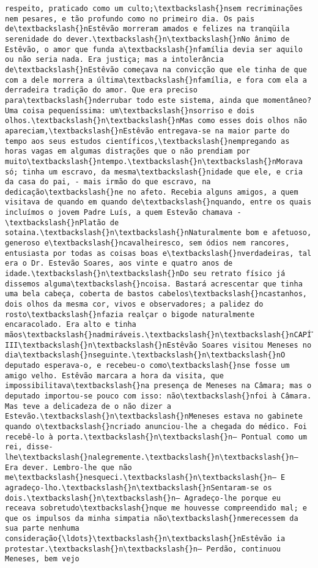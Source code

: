 \documentclass[11pt]{article}
\begin{document}
\begin{Verbatim}[commandchars=\\\{\}]
respeito, praticado como um culto;\textbackslash{}nsem recriminações nem pesares, e tão profundo como no primeiro dia. Os pais de\textbackslash{}nEstêvão morreram amados e felizes na tranqüila serenidade do dever.\textbackslash{}n\textbackslash{}nNo ânimo de Estêvão, o amor que funda a\textbackslash{}nfamília devia ser aquilo ou não seria nada. Era justiça; mas a intolerância de\textbackslash{}nEstêvão começava na convicção que ele tinha de que com a dele morrera a última\textbackslash{}nfamília, e fora com ela a derradeira tradição do amor. Que era preciso para\textbackslash{}nderrubar todo este sistema, ainda que momentâneo? Uma coisa pequeníssima: um\textbackslash{}nsorriso e dois olhos.\textbackslash{}n\textbackslash{}nMas como esses dois olhos não apareciam,\textbackslash{}nEstêvão entregava-se na maior parte do tempo aos seus estudos científicos,\textbackslash{}nempregando as horas vagas em algumas distrações que o não prendiam por muito\textbackslash{}ntempo.\textbackslash{}n\textbackslash{}nMorava só; tinha um escravo, da mesma\textbackslash{}nidade que ele, e cria da casa do pai, - mais irmão do que escravo, na dedicação\textbackslash{}ne no afeto. Recebia alguns amigos, a quem visitava de quando em quando de\textbackslash{}nquando, entre os quais incluímos o jovem Padre Luís, a quem Estevão chamava -\textbackslash{}nPlatão de sotaina.\textbackslash{}n\textbackslash{}nNaturalmente bom e afetuoso, generoso e\textbackslash{}ncavalheiresco, sem ódios nem rancores, entusiasta por todas as coisas boas e\textbackslash{}nverdadeiras, tal era o Dr. Estevão Soares, aos vinte e quatro anos de idade.\textbackslash{}n\textbackslash{}nDo seu retrato físico já dissemos alguma\textbackslash{}ncoisa. Bastará acrescentar que tinha uma bela cabeça, coberta de bastos cabelos\textbackslash{}ncastanhos, dois olhos da mesma cor, vivos e observadores; a palidez do rosto\textbackslash{}nfazia realçar o bigode naturalmente encaracolado. Era alto e tinha mãos\textbackslash{}nadmiráveis.\textbackslash{}n\textbackslash{}nCAPÍTULO III\textbackslash{}n\textbackslash{}nEstêvão Soares visitou Meneses no dia\textbackslash{}nseguinte.\textbackslash{}n\textbackslash{}nO deputado esperava-o, e recebeu-o como\textbackslash{}nse fosse um amigo velho. Estêvão marcara a hora da visita, que impossibilitava\textbackslash{}na presença de Meneses na Câmara; mas o deputado importou-se pouco com isso: não\textbackslash{}nfoi à Câmara. Mas teve a delicadeza de o não dizer a Estevão.\textbackslash{}n\textbackslash{}nMeneses estava no gabinete quando o\textbackslash{}ncriado anunciou-lhe a chegada do médico. Foi recebê-lo à porta.\textbackslash{}n\textbackslash{}n— Pontual como um rei, disse-lhe\textbackslash{}nalegremente.\textbackslash{}n\textbackslash{}n— Era dever. Lembro-lhe que não me\textbackslash{}nesqueci.\textbackslash{}n\textbackslash{}n— E agradeço-lho.\textbackslash{}n\textbackslash{}nSentaram-se os dois.\textbackslash{}n\textbackslash{}n— Agradeço-lhe porque eu receava sobretudo\textbackslash{}nque me houvesse compreendido mal; e que os impulsos da minha simpatia não\textbackslash{}nmerecessem da sua parte nenhuma consideração{\ldots}\textbackslash{}n\textbackslash{}nEstêvão ia protestar.\textbackslash{}n\textbackslash{}n— Perdão, continuou Meneses, bem vejo 
\end{Verbatim}
\end{document}
